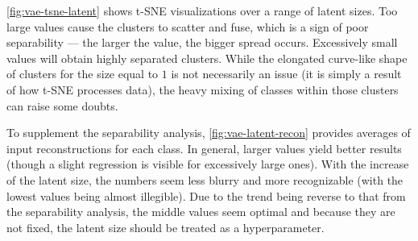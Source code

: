 \vspace{\baselineskip}
\autoref{fig:vae-tsne-latent} shows t-SNE visualizations over a range of latent sizes. Too large values cause the clusters to scatter and fuse, which is a sign of poor separability — the larger the value, the bigger spread occurs. Excessively small values will obtain highly separated clusters. While the elongated curve-like shape of clusters for the size equal to $1$ is not necessarily an issue (it is simply a result of how t-SNE processes data), the heavy mixing of classes within those clusters can raise some doubts.

\vspace{\baselineskip}
To supplement the separability analysis, \autoref{fig:vae-latent-recon} provides averages of input reconstructions for each class. In general, larger values yield better results (though a slight regression is visible for excessively large ones). With the increase of the latent size, the numbers seem less blurry and more recognizable (with the lowest values being almost illegible). Due to the trend being reverse to that from the separability analysis, the middle values seem optimal and because they are not fixed, the latent size should be treated as a hyperparameter.


